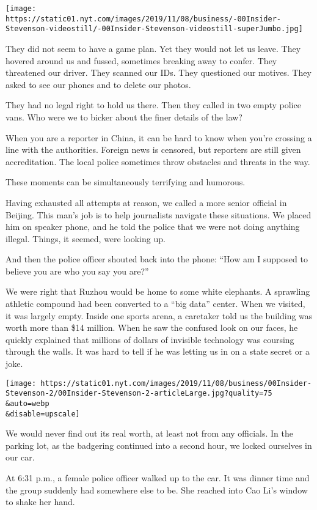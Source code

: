 \texttt{[image: https://static01.nyt.com/images/2019/11/08/business/-00Insider-Stevenson-videostill/-00Insider-Stevenson-videostill-superJumbo.jpg]}

They did not seem to have a game plan. Yet they would not let us leave.
They hovered around us and fussed, sometimes breaking away to confer.
They threatened our driver. They scanned our IDs. They questioned our
motives. They asked to see our phones and to delete our photos.

They had no legal right to hold us there. Then they called in two empty
police vans. Who were we to bicker about the finer details of the law?

When you are a reporter in China, it can be hard to know when you're
crossing a line with the authorities. Foreign news is censored, but
reporters are still given accreditation. The local police sometimes
throw obstacles and threats in the way.

These moments can be simultaneously terrifying and humorous.

Having exhausted all attempts at reason, we called a more senior
official in Beijing. This man's job is to help journalists navigate
these situations. We placed him on speaker phone, and he told the police
that we were not doing anything illegal. Things, it seemed, were looking
up.

And then the police officer shouted back into the phone: ``How am I
supposed to believe you are who you say you are?''

We were right that Ruzhou would be home to some white elephants. A
sprawling athletic compound had been converted to a ``big data'' center.
When we visited, it was largely empty. Inside one sports arena, a
caretaker told us the building was worth more than \$14 million. When he
saw the confused look on our faces, he quickly explained that millions
of dollars of invisible technology was coursing through the walls. It
was hard to tell if he was letting us in on a state secret or a joke.

\texttt{[image: https://static01.nyt.com/images/2019/11/08/business/00Insider-Stevenson-2/00Insider-Stevenson-2-articleLarge.jpg?quality=75\\\&auto=webp\\\&disable=upscale]}

We would never find out its real worth, at least not from any officials.
In the parking lot, as the badgering continued into a second hour, we
locked ourselves in our car.

At 6:31 p.m., a female police officer walked up to the car. It was
dinner time and the group suddenly had somewhere else to be. She reached
into Cao Li's window to shake her hand.

